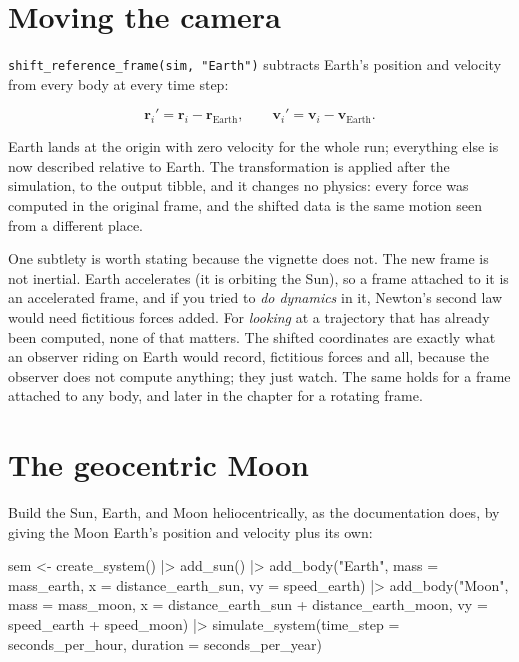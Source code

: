 \documentclass[
  10.5pt,
  letterpaper,
]{scrbook}
\newenvironment{Shaded}{\begin{snugshade}}{\end{snugshade}}
\newcommand{\AttributeTok}[1]{\textcolor[rgb]{0.00,0.00,0.00}{#1}}
\newcommand{\FunctionTok}[1]{\textcolor[rgb]{0.00,0.00,0.00}{#1}}
\newcommand{\NormalTok}[1]{\textcolor[rgb]{0.00,0.00,0.00}{#1}}
\newcommand{\OtherTok}[1]{\textcolor[rgb]{0.00,0.00,0.00}{#1}}
\newcommand{\SpecialCharTok}[1]{\textcolor[rgb]{0.00,0.00,0.00}{#1}}
\newcommand{\StringTok}[1]{\textcolor[rgb]{0.00,0.00,0.00}{#1}}
\newcounter{none} %
\theoremstyle{definition}
\theoremstyle{plain}
\theoremstyle{remark}
\begin{document}
\section{Moving the camera}\label{moving-the-camera}

\texttt{shift\_reference\_frame(sim,\ "Earth")} subtracts Earth's
position and velocity from every body at every time step:

\[
\mathbf{r}_i' = \mathbf{r}_i - \mathbf{r}_{\mathrm{Earth}}, \qquad
\mathbf{v}_i' = \mathbf{v}_i - \mathbf{v}_{\mathrm{Earth}}.
\]

Earth lands at the origin with zero velocity for the whole run;
everything else is now described relative to Earth. The transformation
is applied after the simulation, to the output tibble, and it changes no
physics: every force was computed in the original frame, and the shifted
data is the same motion seen from a different place.

One subtlety is worth stating because the vignette does not. The new
frame is not inertial. Earth accelerates (it is orbiting the Sun), so a
frame attached to it is an accelerated frame, and if you tried to
\emph{do dynamics} in it, Newton's second law would need fictitious
forces added. For \emph{looking} at a trajectory that has already been
computed, none of that matters. The shifted coordinates are exactly what
an observer riding on Earth would record, fictitious forces and all,
because the observer does not compute anything; they just watch. The
same holds for a frame attached to any body, and later in the chapter
for a rotating frame.

\section{The geocentric Moon}\label{the-geocentric-moon}

Build the Sun, Earth, and Moon heliocentrically, as the documentation
does, by giving the Moon Earth's position and velocity plus its own:

\begin{Shaded}
\begin{Highlighting}[]
\NormalTok{sem }\OtherTok{\textless{}{-}} \FunctionTok{create\_system}\NormalTok{() }\SpecialCharTok{|\textgreater{}}
  \FunctionTok{add\_sun}\NormalTok{() }\SpecialCharTok{|\textgreater{}}
  \FunctionTok{add\_body}\NormalTok{(}\StringTok{"Earth"}\NormalTok{, }\AttributeTok{mass =}\NormalTok{ mass\_earth, }\AttributeTok{x =}\NormalTok{ distance\_earth\_sun, }\AttributeTok{vy =}\NormalTok{ speed\_earth) }\SpecialCharTok{|\textgreater{}}
  \FunctionTok{add\_body}\NormalTok{(}\StringTok{"Moon"}\NormalTok{,  }\AttributeTok{mass =}\NormalTok{ mass\_moon,}
           \AttributeTok{x =}\NormalTok{ distance\_earth\_sun }\SpecialCharTok{+}\NormalTok{ distance\_earth\_moon,}
           \AttributeTok{vy =}\NormalTok{ speed\_earth }\SpecialCharTok{+}\NormalTok{ speed\_moon) }\SpecialCharTok{|\textgreater{}}
  \FunctionTok{simulate\_system}\NormalTok{(}\AttributeTok{time\_step =}\NormalTok{ seconds\_per\_hour, }\AttributeTok{duration =}\NormalTok{ seconds\_per\_year)}
\end{Highlighting}
\end{Shaded}
\end{document}
